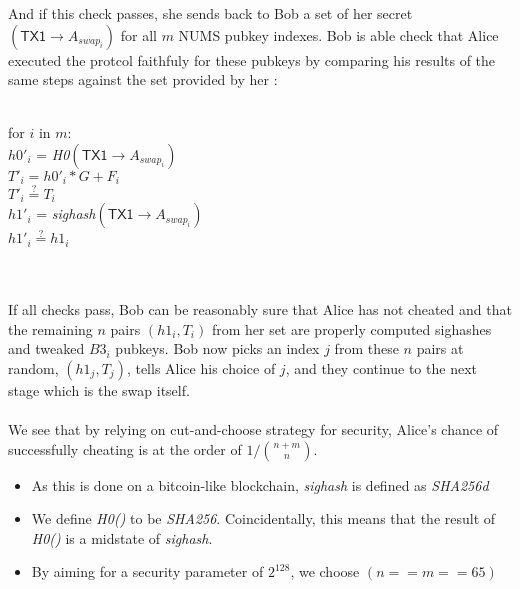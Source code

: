 \documentclass[12pt,a4paper]{article}
\begin{document}
And if this check passes, she sends back to Bob a set of her secret $(\textsf{TX1} \rightarrow A_{swap_i})$ for all $m$ NUMS pubkey indexes.  
Bob is able check that Alice executed the protcol faithfuly for these pubkeys by comparing his results of the same steps against the set provided by her : \\ \\
\begin{footnotesize}
for $i$ in $m$: \\
    \indent $h0'_i$ = \emph{H0}$(\textsf{TX1} \rightarrow A_{swap_i})$ \\
    \indent $T'_i = h0'_i*G + F_i$ \\
    \indent $T'_i \stackrel{?}{=} T_i$ \\
    \indent $h1'_i$ = \emph{sighash}$(\textsf{TX1} \rightarrow A_{swap_i})$ \\
    \indent $h1'_i \stackrel{?}{=} h1_i$ \\
\end{footnotesize} \\ \\
If all checks pass, Bob can be reasonably sure that Alice has not cheated and that the remaining $n$ pairs $(h1_i, T_i)$ from her set are properly computed sighashes and tweaked $B3_i$ pubkeys.  Bob now picks an index $j$ from these $n$ pairs at random, $(h1_j, T_j)$, tells Alice his choice of $j$, and they continue to the next stage which is the swap itself. \\ \\
We see that by relying on cut-and-choose strategy for security, Alice's chance of successfully cheating is at the order of $1/\binom{n+m}{n}$.
\begin{tiny}
\begin{itemize}
\item As this is done on a bitcoin-like blockchain, \emph{sighash} is defined as \emph{SHA256d}
\item We define \emph{H0()} to be \emph{SHA256}.  Coincidentally, this means that the result of  \emph{H0()} is a midstate of \emph{sighash}.
\item By aiming for a security parameter of $2^{128}$, we choose $(n == m == 65)$
\end{itemize}
\end{tiny}
\newpage
\end{document}
